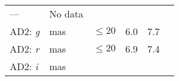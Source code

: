 \documentclass[DM, lsstdraft, toc]{lsstdoc}
\begin{document}
\begin{longtable}[]{@{}llllll@{}}
\begin{minipage}[t]{0.12\columnwidth}
---\strut
\end{minipage} & \begin{minipage}[t]{0.17\columnwidth}\raggedright\strut
No data\strut
\end{minipage}\tabularnewline
\begin{minipage}[t]{0.12\columnwidth}\raggedright\strut
AD2: \emph{g}\strut
\end{minipage} & \begin{minipage}[t]{0.06\columnwidth}\raggedright\strut
mas\strut
\end{minipage} & \begin{minipage}[t]{0.14\columnwidth}\raggedright\strut
\(\leq 20\)\strut
\end{minipage} & \begin{minipage}[t]{0.12\columnwidth}\raggedright\strut
6.0\strut
\end{minipage} & \begin{minipage}[t]{0.12\columnwidth}\raggedright\strut
7.7\strut
\end{minipage} & \begin{minipage}[t]{0.17\columnwidth}\raggedright\strut
\strut
\end{minipage}\tabularnewline
\begin{minipage}[t]{0.12\columnwidth}\raggedright\strut
AD2: \emph{r}\strut
\end{minipage} & \begin{minipage}[t]{0.06\columnwidth}\raggedright\strut
mas\strut
\end{minipage} & \begin{minipage}[t]{0.14\columnwidth}\raggedright\strut
\(\leq 20\)\strut
\end{minipage} & \begin{minipage}[t]{0.12\columnwidth}\raggedright\strut
6.9\strut
\end{minipage} & \begin{minipage}[t]{0.12\columnwidth}\raggedright\strut
7.4\strut
\end{minipage} & \begin{minipage}[t]{0.17\columnwidth}\raggedright\strut
\strut
\end{minipage}\tabularnewline
\begin{minipage}[t]{0.12\columnwidth}\raggedright\strut
AD2: \emph{i}\strut
\end{minipage} & \begin{minipage}[t]{0.06\columnwidth}\raggedright\strut
mas\strut
\end{minipage} & \begin{minipage}[t]{0.14\columnwidth}\raggedright\strut

\end{minipage}
\end{longtable}
\end{document}
